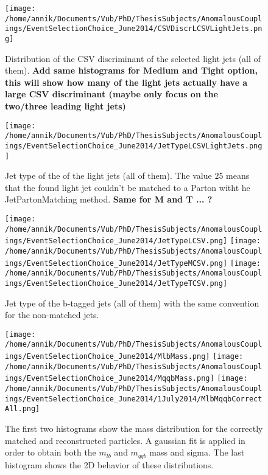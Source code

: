 \begin{center}
\begin{figure}[!h]
\texttt{[image: /home/annik/Documents/Vub/PhD/ThesisSubjects/AnomalousCouplings/EventSelectionChoice\_June2014/CSVDiscrLCSVLightJets.png]}
\caption{ Distribution of the CSV discriminant of the selected light jets (all of them). \textbf{Add same histograms for Medium and Tight option, this will show how many of the light jets actually have a large CSV discriminant (maybe only focus on the two/three leading light jets) }}
\end{figure}

\begin{figure}[!h]
\texttt{[image: /home/annik/Documents/Vub/PhD/ThesisSubjects/AnomalousCouplings/EventSelectionChoice\_June2014/JetTypeLCSVLightJets.png]}
\caption{Jet type of the of the light jets (all of them). The value $25$ means that the found light jet couldn't be matched to a Parton witht he JetPartonMatching method. \textbf{Same for M and T ... ?} }
\end{figure}

\begin{figure}[!h]
\texttt{[image: /home/annik/Documents/Vub/PhD/ThesisSubjects/AnomalousCouplings/EventSelectionChoice\_June2014/JetTypeLCSV.png]}
\texttt{[image: /home/annik/Documents/Vub/PhD/ThesisSubjects/AnomalousCouplings/EventSelectionChoice\_June2014/JetTypeMCSV.png]}
\texttt{[image: /home/annik/Documents/Vub/PhD/ThesisSubjects/AnomalousCouplings/EventSelectionChoice\_June2014/JetTypeTCSV.png]}
\caption{Jet type of the b-tagged jets (all of them) with the same convention for the non-matched jets. }
\end{figure}

\begin{figure}[!h]
\texttt{[image: /home/annik/Documents/Vub/PhD/ThesisSubjects/AnomalousCouplings/EventSelectionChoice\_June2014/MlbMass.png]}
\texttt{[image: /home/annik/Documents/Vub/PhD/ThesisSubjects/AnomalousCouplings/EventSelectionChoice\_June2014/MqqbMass.png]}
\texttt{[image: /home/annik/Documents/Vub/PhD/ThesisSubjects/AnomalousCouplings/EventSelectionChoice\_June2014/1July2014/MlbMqqbCorrectAll.png]}
\caption{The first two histograms show the mass distribution for the correctly matched and reconstructed particles. A gaussian fit is applied in order to obtain both the $m_{lb}$ and $m_{qqb}$ mass and sigma. The last histogram shows the 2D behavior of these distributions. }
\end{figure}
\end{center}

